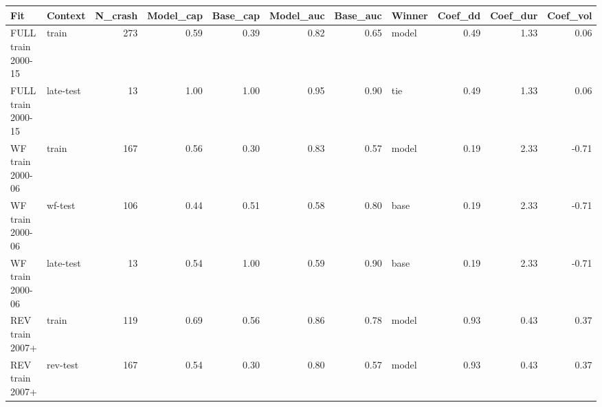 \begin{tabular}{llrrrrrlrrr}
\toprule
Fit & Context & N_crash & Model_cap & Base_cap & Model_auc & Base_auc & Winner & Coef_dd & Coef_dur & Coef_vol \\
\midrule
FULL train 2000-15 & train & 273 & 0.59 & 0.39 & 0.82 & 0.65 & model & 0.49 & 1.33 & 0.06 \\
FULL train 2000-15 & late-test & 13 & 1.00 & 1.00 & 0.95 & 0.90 & tie & 0.49 & 1.33 & 0.06 \\
WF train 2000-06 & train & 167 & 0.56 & 0.30 & 0.83 & 0.57 & model & 0.19 & 2.33 & -0.71 \\
WF train 2000-06 & wf-test & 106 & 0.44 & 0.51 & 0.58 & 0.80 & base & 0.19 & 2.33 & -0.71 \\
WF train 2000-06 & late-test & 13 & 0.54 & 1.00 & 0.59 & 0.90 & base & 0.19 & 2.33 & -0.71 \\
REV train 2007+ & train & 119 & 0.69 & 0.56 & 0.86 & 0.78 & model & 0.93 & 0.43 & 0.37 \\
REV train 2007+ & rev-test & 167 & 0.54 & 0.30 & 0.80 & 0.57 & model & 0.93 & 0.43 & 0.37 \\
\bottomrule
\end{tabular}
